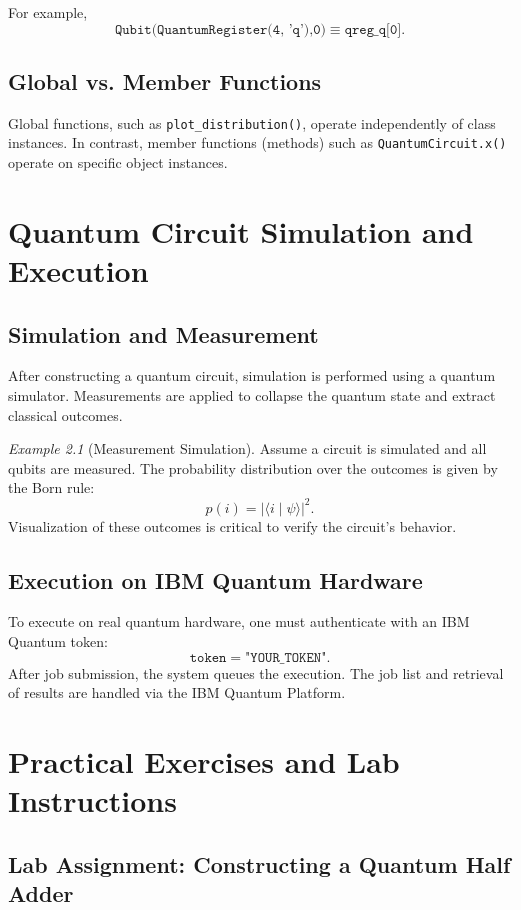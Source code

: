 \documentclass[12pt]{book}
\theoremstyle{remark}
\newtheorem{example}{Example}[chapter]
\begin{document}
	For example,
	\[
	\texttt{Qubit(QuantumRegister(4, 'q'),0)} \equiv \texttt{qreg\_q[0]}.
	\]
	
	\section{Global vs. Member Functions}
	Global functions, such as \texttt{plot\_distribution()}, operate independently of class instances. In contrast, member functions (methods) such as \texttt{QuantumCircuit.x()} operate on specific object instances.
	
	\chapter{Quantum Circuit Simulation and Execution}
	\section{Simulation and Measurement}
	After constructing a quantum circuit, simulation is performed using a quantum simulator. Measurements are applied to collapse the quantum state and extract classical outcomes.
	
	\begin{example}[Measurement Simulation]
		Assume a circuit is simulated and all qubits are measured. The probability distribution over the outcomes is given by the Born rule:
		\[
		p(i) = |\langle i \mid \psi \rangle|^2.
		\]
		Visualization of these outcomes is critical to verify the circuit's behavior.
	\end{example}
	
	\section{Execution on IBM Quantum Hardware}
	To execute on real quantum hardware, one must authenticate with an IBM Quantum token:
	\[
	\texttt{token} = \texttt{"YOUR\_TOKEN"}.
	\]
	After job submission, the system queues the execution. The job list and retrieval of results are handled via the IBM Quantum Platform.
	
	\chapter{Practical Exercises and Lab Instructions}
	\section{Lab Assignment: Constructing a Quantum Half Adder}
\end{document}
